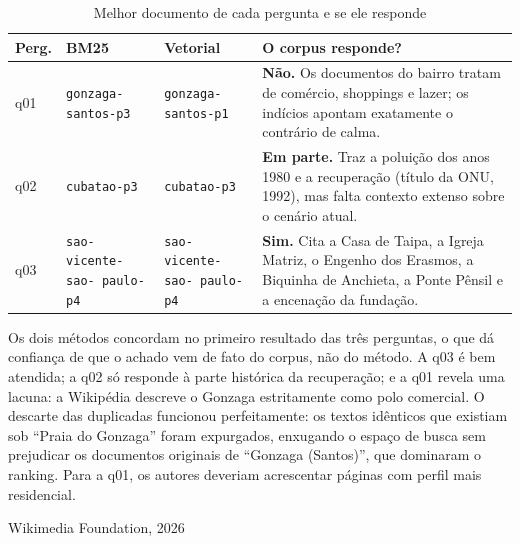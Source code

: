 \documentclass[
  article,
  12pt,
  oneside,
  a4paper,
  english,
  brazil
]{abntex2}
\begin{document}
\begin{table}[htb]
  \centering
  \caption{Melhor documento de cada pergunta e se ele responde}
  \label{tab:busca}
  \footnotesize
  \begin{tabular}{@{}p{}p{}p{}p{}@{}}
    \toprule
    \textbf{Perg.} & \textbf{BM25} & \textbf{Vetorial} & \textbf{O corpus responde?} \\
    \midrule
    q01 & \texttt{gonzaga-santos-p3} & \texttt{gonzaga-santos-p1} &
      \textbf{Não.} Os documentos do bairro tratam de comércio, shoppings e
      lazer; os indícios apontam exatamente o contrário de calma. \\
    q02 & \texttt{cubatao-p3} & \texttt{cubatao-p3} &
      \textbf{Em parte.} Traz a poluição dos anos 1980 e a recuperação (título da
      ONU, 1992), mas falta contexto extenso sobre o cenário atual. \\
    q03 & \texttt{sao-vicente-sao-
    paulo-p4} & \texttt{sao-vicente-sao-
    paulo-p4} &
      \textbf{Sim.} Cita a Casa de Taipa, a Igreja Matriz, o Engenho dos Erasmos,
      a Biquinha de Anchieta, a Ponte Pênsil e a encenação da fundação. \\
    \bottomrule
  \end{tabular}
\end{table}

Os dois métodos concordam no primeiro resultado das três perguntas, o que dá
confiança de que o achado vem de fato do corpus, não do método. A q03 é bem atendida; a
q02 só responde à parte histórica da recuperação; e a q01 revela uma lacuna: a 
Wikipédia descreve o Gonzaga estritamente como polo comercial. O descarte das duplicadas 
funcionou perfeitamente: os textos idênticos que existiam sob ``Praia do Gonzaga'' foram 
expurgados, enxugando o espaço de busca sem prejudicar os documentos originais 
de ``Gonzaga (Santos)'', que dominaram o ranking. Para a q01, os autores deveriam 
acrescentar páginas com perfil mais residencial.


\postextual

Wikimedia Foundation, 2026
\end{document}
